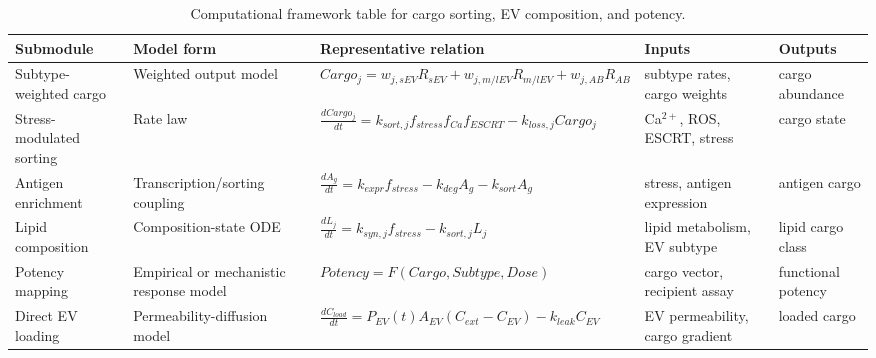 \begin{table}[t]
\footnotesize\sf
\centering
\caption{Computational framework table for cargo sorting, EV composition, and potency.\label{T_A12_comp_cargo}}
\begin{tabular}{p{2.6cm} p{3.0cm} p{4.6cm} p{2.8cm} p{2.8cm}}
\toprule
\textbf{Submodule} & \textbf{Model form} & \textbf{Representative relation} & \textbf{Inputs} & \textbf{Outputs} \\
\midrule
Subtype-weighted cargo & Weighted output model \cite{jeppesen2019reassessment,kugeratski2021quantitative,cappe2023systematic} & $Cargo_j=w_{j,sEV}R_{sEV}+w_{j,m/lEV}R_{m/lEV}+w_{j,AB}R_{AB}$ & subtype rates, cargo weights & cargo abundance \\
Stress-modulated sorting & Rate law \cite{shurtleff2016ybox,liu2021selective,santangelo2016syncrip,pakhomova2012oxidative} & $\frac{dCargo_j}{dt}=k_{sort,j}f_{stress}f_{Ca}f_{ESCRT}-k_{loss,j}Cargo_j$ & Ca$^{2+}$, ROS, ESCRT, stress & cargo state \\
Antigen enrichment & Transcription/sorting coupling \cite{szlasa2024mage,kumar2022tumour} & $\frac{dA_g}{dt}=k_{expr}f_{stress}-k_{deg}A_g-k_{sort}A_g$ & stress, antigen expression & antigen cargo \\
Lipid composition & Composition-state ODE \cite{skotland2023lipids,choezom2022nsmase2,crivelli2022ceramideTransfer} & $\frac{dL_j}{dt}=k_{syn,j}f_{stress}-k_{sort,j}L_j$ & lipid metabolism, EV subtype & lipid cargo class \\
Potency mapping & Empirical or mechanistic response model \cite{hagey2023cellular,tkach2017qualitative,fuhrmann2015active} & $Potency=F(Cargo,Subtype,Dose)$ & cargo vector, recipient assay & functional potency \\
Direct EV loading & Permeability-diffusion model \cite{kooijmans2013electroporation,hood2014maximizing,fuhrmann2015active,didiot2018optimized} & $\frac{dC_{load}}{dt}=P_{EV}(t)A_{EV}(C_{ext}-C_{EV})-k_{leak}C_{EV}$ & EV permeability, cargo gradient & loaded cargo \\
\bottomrule
\end{tabular}
\end{table}


